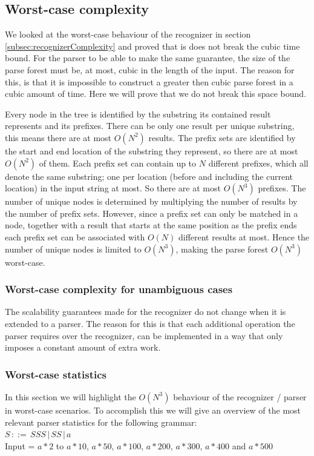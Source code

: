 \documentclass[a4paper,10pt]{article}
\begin{document}
\subsection{Worst-case complexity}

We looked at the worst-case behaviour of the recognizer in section \ref{subsec:recognizerComplexity} and proved that is does not break the cubic time bound. For the parser to be able to make the same guarantee, the size of the parse forest must be, at most, cubic in the length of the input. The reason for this, is that it is impossible to construct a greater then cubic parse forest in a cubic amount of time. Here we will prove that we do not break this space bound.

Every node in the tree is identified by the substring its contained result represents and its prefixes. There can be only one result per unique substring, this means there are at most $O(N^2)$ results. The prefix sets are identified by the start and end location of the substring they represent, so there are at most $O(N^2)$ of them. Each prefix set can contain up to $N$ different prefixes, which all denote the same substring; one per location (before and including the current location) in the input string at most. So there are at most $O(N^3)$ prefixes. The number of unique nodes is determined by multiplying the number of results by the number of prefix sets. However, since a prefix set can only be matched in a node, together with a result that starts at the same position as the prefix ends each prefix set can be associated with $O(N)$ different results at most. Hence the number of unique nodes is limited to $O(N^3)$, making the parse forest $O(N^3)$ worst-case.

\subsubsection{Worst-case complexity for unambiguous cases}

The scalability guarantees made for the recognizer do not change when it is extended to a parser. The reason for this is that each additional operation the parser requires over the recognizer, can be implemented in a way that only imposes a constant amount of extra work.

\subsubsection{Worst-case statistics}
In this section we will highlight the $O(N^3)$ behaviour of the recognizer / parser in worst-case scenarios. To accomplish this we will give an overview of the most relevant parser statistics for the following grammar:\\
$S\,::=\,SSS\,|\,SS\,|\,a$\\
Input = $a * 2$ to $a * 10$, $a * 50$, $a * 100$, $a * 200$, $a * 300$, $a * 400$ and $a * 500$
\end{document}
